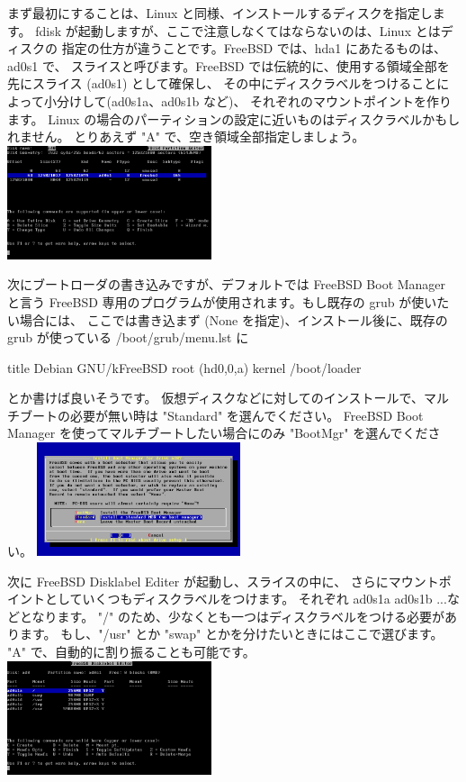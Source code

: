 \documentclass[mingoth,a4paper]{jsarticle}
\begin{document}
まず最初にすることは、Linux と同様、インストールするディスクを指定します。
fdisk が起動しますが、ここで注意しなくてはならないのは、Linux とはディスクの
指定の仕方が違うことです。FreeBSD では、hda1 にあたるものは、ad0s1 で、
スライスと呼びます。FreeBSD では伝統的に、使用する領域全部を先にスライス (ad0s1) として確保し、
その中にディスクラベルをつけることによって小分けして(ad0s1a、ad0s1b など)、
それぞれのマウントポイントを作ります。
Linux の場合のパーティションの設定に近いものはディスクラベルかもしれません。
とりあえず "A" で、空き領域全部指定しましょう。
\includegraphics[width=6cm]{image200906/kfreebsd03.png}

次にブートローダの書き込みですが、デフォルトでは FreeBSD Boot Manager と言う
 FreeBSD 専用のプログラムが使用されます。もし既存の grub が使いたい場合には、
ここでは書き込まず (None を指定)、インストール後に、既存の grub が使っている 
/boot/grub/menu.lst に
\begin{commandline}
title Debian GNU/kFreeBSD
root (hd0,0,a)
kernel /boot/loader
\end{commandline}
とか書けば良いそうです。
仮想ディスクなどに対してのインストールで、マルチブートの必要が無い時は "Standard" を選んでください。
FreeBSD Boot Manager を使ってマルチブートしたい場合にのみ "BootMgr" を選んでください。
\includegraphics[width=6cm]{image200906/kfreebsd04.png}

次に FreeBSD Disklabel Editer が起動し、スライスの中に、
さらにマウントポイントとしていくつもディスクラベルをつけます。
それぞれ ad0s1a ad0s1b ...などとなります。
"/" のため、少なくとも一つはディスクラベルをつける必要があります。
もし、"/usr" とか "swap" とかを分けたいときにはここで選びます。
"A" で、自動的に割り振ることも可能です。
\includegraphics[width=6cm]{image200906/kfreebsd05.png}
\end{document}
